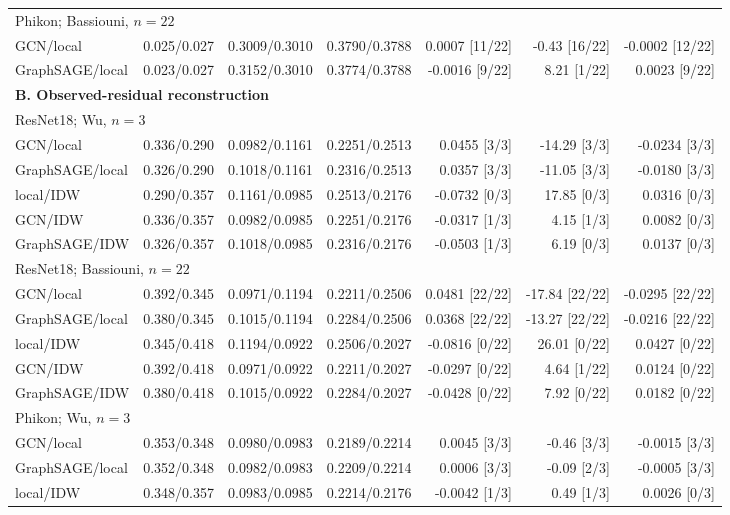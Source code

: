 \begin{table}[p]
\begin{tabular}{lrrrrrr}
\multicolumn{7}{l}{Phikon; Bassiouni, $n=22$}\\
GCN/local & 0.025/0.027 & 0.3009/0.3010 & 0.3790/0.3788 & 0.0007 [11/22] & -0.43 [16/22] & -0.0002 [12/22]\\
GraphSAGE/local & 0.023/0.027 & 0.3152/0.3010 & 0.3774/0.3788 & -0.0016 [9/22] & 8.21 [1/22] & 0.0023 [9/22]\\
\midrule
\multicolumn{7}{l}{\textbf{B. Observed-residual reconstruction}}\\
\multicolumn{7}{l}{ResNet18; Wu, $n=3$}\\
GCN/local & 0.336/0.290 & 0.0982/0.1161 & 0.2251/0.2513 & 0.0455 [3/3] & -14.29 [3/3] & -0.0234 [3/3]\\
GraphSAGE/local & 0.326/0.290 & 0.1018/0.1161 & 0.2316/0.2513 & 0.0357 [3/3] & -11.05 [3/3] & -0.0180 [3/3]\\
local/IDW & 0.290/0.357 & 0.1161/0.0985 & 0.2513/0.2176 & -0.0732 [0/3] & 17.85 [0/3] & 0.0316 [0/3]\\
GCN/IDW & 0.336/0.357 & 0.0982/0.0985 & 0.2251/0.2176 & -0.0317 [1/3] & 4.15 [1/3] & 0.0082 [0/3]\\
GraphSAGE/IDW & 0.326/0.357 & 0.1018/0.0985 & 0.2316/0.2176 & -0.0503 [1/3] & 6.19 [0/3] & 0.0137 [0/3]\\
\multicolumn{7}{l}{ResNet18; Bassiouni, $n=22$}\\
GCN/local & 0.392/0.345 & 0.0971/0.1194 & 0.2211/0.2506 & 0.0481 [22/22] & -17.84 [22/22] & -0.0295 [22/22]\\
GraphSAGE/local & 0.380/0.345 & 0.1015/0.1194 & 0.2284/0.2506 & 0.0368 [22/22] & -13.27 [22/22] & -0.0216 [22/22]\\
local/IDW & 0.345/0.418 & 0.1194/0.0922 & 0.2506/0.2027 & -0.0816 [0/22] & 26.01 [0/22] & 0.0427 [0/22]\\
GCN/IDW & 0.392/0.418 & 0.0971/0.0922 & 0.2211/0.2027 & -0.0297 [0/22] & 4.64 [1/22] & 0.0124 [0/22]\\
GraphSAGE/IDW & 0.380/0.418 & 0.1015/0.0922 & 0.2284/0.2027 & -0.0428 [0/22] & 7.92 [0/22] & 0.0182 [0/22]\\
\multicolumn{7}{l}{Phikon; Wu, $n=3$}\\
GCN/local & 0.353/0.348 & 0.0980/0.0983 & 0.2189/0.2214 & 0.0045 [3/3] & -0.46 [3/3] & -0.0015 [3/3]\\
GraphSAGE/local & 0.352/0.348 & 0.0982/0.0983 & 0.2209/0.2214 & 0.0006 [3/3] & -0.09 [2/3] & -0.0005 [3/3]\\
local/IDW & 0.348/0.357 & 0.0983/0.0985 & 0.2214/0.2176 & -0.0042 [1/3] & 0.49 [1/3] & 0.0026 [0/3]\\

\end{tabular}
\end{table}
